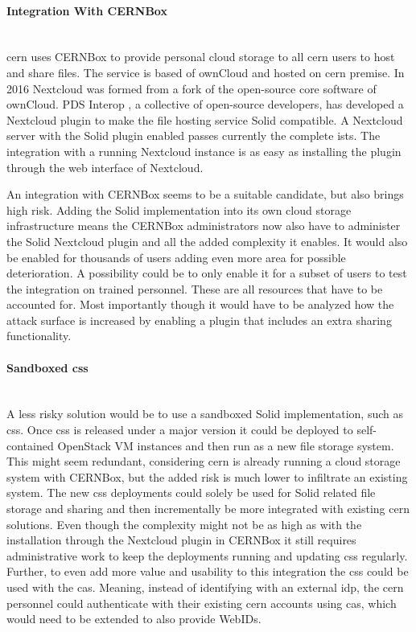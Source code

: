 \paragraph{Integration With CERNBox}\mbox{}\\

\gls{cern} uses CERNBox \cite{cernbox} to provide personal cloud storage to all \gls{cern} users to host and share files. The service is based of ownCloud \cite{owncloud} and hosted on \gls{cern} premise. In 2016 Nextcloud \cite{nextcloud} was formed from a fork of the open-source core software of ownCloud. PDS Interop \cite{pds-interop}, a collective of open-source developers, has developed a Nextcloud \cite{nextcloud} plugin to make the file hosting service Solid compatible. A Nextcloud server with the Solid plugin enabled passes currently the complete \gls{ists}. The integration with a running Nextcloud instance is as easy as installing the plugin through the web interface of Nextcloud.

An integration with CERNBox seems to be a suitable candidate, but also brings high risk. Adding the Solid implementation into its own cloud storage infrastructure means the CERNBox administrators now also have to administer the Solid Nextcloud plugin and all the added complexity it enables. It would also be enabled for thousands of users adding even more area for possible deterioration.
A possibility could be to only enable it for a subset of users to test the integration on trained personnel. These are all resources that have to be accounted for. Most importantly though it would have to be analyzed how the attack surface is increased by enabling a plugin that includes an extra sharing functionality.
\vspace{0.5cm}
\paragraph{Sandboxed \gls{css}}\mbox{}\\

A less risky solution would be to use a sandboxed Solid implementation, such as \gls{css}. Once \gls{css} is released under a major version it could be deployed to self-contained OpenStack VM instances and then run as a new file storage system. This might seem redundant, considering \gls{cern} is already running a cloud storage system with CERNBox, but the added risk is much lower to infiltrate an existing system. The new \gls{css} deployments could solely be used for Solid related file storage and sharing and then incrementally be more integrated with existing \gls{cern} solutions. Even though the complexity might not be as high as with the installation through the Nextcloud plugin in CERNBox it still requires administrative work to keep the deployments running and updating \gls{css} regularly. Further, to even add more value and usability to this integration the \gls{css} could be used with the \gls{cas}. Meaning, instead of identifying with an external \gls{idp}, the \gls{cern} personnel could authenticate with their existing \gls{cern} accounts using \gls{cas}, which would need to be extended to also provide WebIDs.

